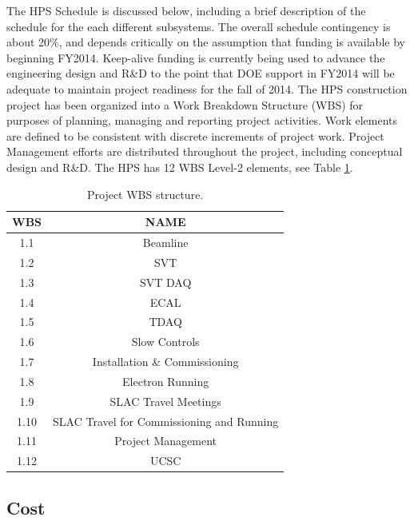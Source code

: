The HPS Schedule is discussed below, including a brief description of the schedule for the each 
different subsystems. The overall schedule contingency is about 20\%, and depends critically on the assumption that 
funding is available by beginning FY2014. Keep-alive funding is currently being used to advance the engineering design and R\&D to the point
that DOE support in FY2014 will be adequate to maintain project readiness for the fall of 2014. The HPS construction project has been organized 
into a Work Breakdown Structure (WBS) for purposes of planning, 
managing and reporting project activities. Work elements are defined to be consistent with discrete increments of project work. 
Project Management efforts are distributed throughout the project, including conceptual design and R\&D. The HPS has 12 WBS
 Level-2 elements, see Table \ref{tb:wbs_categories}. 

\begin{table}[htdp]
\caption{Project WBS structure.}
\begin{center}
\begin{tabular}{|c|c|}
\hline
WBS& NAME \\
\hline\hline
1.1 & Beamline \\
\hline
1.2 & SVT \\
\hline
1.3 & SVT DAQ \\
\hline
1.4 & ECAL \\
\hline
1.5 & TDAQ \\
\hline
1.6 & Slow Controls \\
\hline
1.7 & Installation \& Commissioning \\
\hline
1.8 & Electron Running \\
\hline
1.9 & SLAC Travel Meetings \\
\hline
1.10 & SLAC Travel for Commissioning and Running \\
\hline
1.11 & Project Management  \\
\hline
1.12 & UCSC  \\
\hline
\hline
\end{tabular}
\end{center}
\label{tb:wbs_categories}
\end{table}%

\subsection{Cost}

